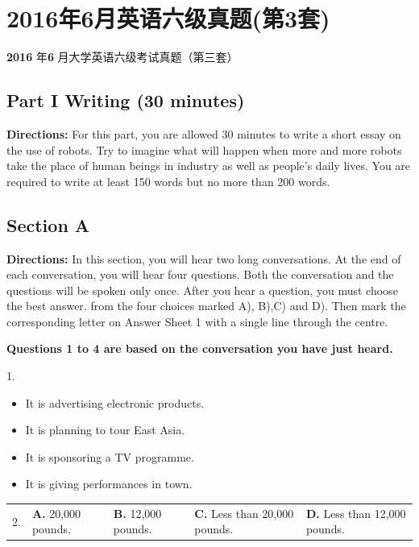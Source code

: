 \documentclass[UTF8,11pt]{ctexart}
\begin{document}
\section*{2016年6月英语六级真题(第3套)}
\textbf{2016} 年\textbf{6} 月大学英语六级考试真题（第三套）


\subsection*{\textbf{Part I Writing (30 minutes)}}


\textbf{Directions:} For this part, you are allowed 30 minutes to write a short essay on the use of robots. Try to imagine what will happen when more and more robots take the place of human beings in industry as well as people’s daily lives. You are required to write at least 150 words but no more than 200 words.


\subsection*{\textbf{Section A}}


\textbf{Directions:} In this section, you will hear two long conversations. At the end of each conversation, you will hear four questions. Both the conversation and the questions will be spoken only once. After you hear a question, you must choose the best answer. from the four choices marked A), B),C) and D). Then mark the corresponding letter on Answer Sheet 1 with a single line through the centre.


\textbf{Questions 1 to 4 are based on the conversation you have just heard.}


1.


\begin{itemize}[leftmargin=2em,itemsep=.2em,topsep=.4em]\item[A.] It is advertising electronic products.
\item[B.] It is planning to tour East Asia.
\item[C.] It is sponsoring a TV programme.
\item[D.] It is giving performances in town.
\end{itemize}

\noindent\begin{tabularx}{\linewidth}{@{}lXXXX@{}}2. & \textbf{A.} 20,000 pounds. & \textbf{B.} 12,000 pounds. & \textbf{C.} Less than 20,000 pounds. & \textbf{D.} Less than 12,000 pounds.\\\end{tabularx}\par
\end{document}
